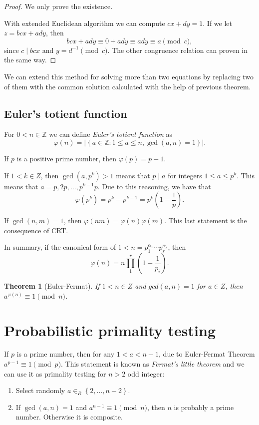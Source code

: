 \documentclass{article}
\newcommand{\Z}{\mathbb{Z}}
\newtheorem{theorem}{Theorem}
\begin{document}
\begin{proof}
    We only prove the existence.

    With extended Euclidean algorithm we can compute $cx + dy = 1$.
    If we let $z = bcx + ady$, then
    \[
        bcx + ady \equiv 0 + ady \equiv ady \equiv a \pmod{c},
    \]
    since $c \mid bcx$ and $y=d^{-1} \pmod{c}$.
    The other congruence relation can proven in the same way.
\end{proof}

We can extend this method for solving more than two equations by replacing two of them with the common solution calculated with the help of previous theorem.

\subsection{Euler's totient function}

For $0 < n \in \Z$ we can define \emph{Euler's totient function} as
\[
    \varphi(n)  = \left \lvert \left \{ a \in \Z : 1 \le a \le n, \gcd(a,n) = 1 \right \} \right \rvert.
\]

If $p$ is a positive prime number, then $\varphi(p) = p - 1$.

If $1 < k \in Z$, then $\gcd(a, p^k) > 1$ means that $p \mid a$ for integers $1 \le a \le p^k$.
This means that $a = p, 2p, \dots, p^{k-1}p$. Due to this reasoning, we have that
\[
    \varphi\left( p^k \right) = p^k - p^{k-1} = p^k \left( 1 - \frac{1}{p} \right).
\]

If $\gcd(n,m)=1$, then $\varphi(nm) = \varphi(n)\varphi(m)$. This last statement is the consequence of CRT.

In summary, if the canonical form of $1 < n = p_1^{\alpha_1}\cdots p_r^{\alpha_r}$, then
\[
    \varphi(n) = n \prod_{1}^{r} \left( 1 - \frac{1}{p_i} \right).
\]

\begin{theorem}[Euler-Fermat]
    If $1 < n \in Z$ and $gcd(a,n) = 1$ for $a \in Z$, then $a^{\varphi(n)} \equiv 1 \pmod{n}$.
\end{theorem}

\section{Probabilistic primality testing}

If $p$ is a prime number, then for any $1 < a < n-1$, due to Euler-Fermat Theorem $a^{p-1} \equiv 1 \pmod{p}$.
This statement is known as \emph{Fermat's little theorem} and we can use it as primality testing for $n > 2$ odd integer:
\begin{enumerate}
    \item Select randomly $a \in_R \left \{ 2, \ldots, n-2 \right \}$.
    \item If $\gcd(a,n)=1$ and $a^{n-1} \equiv 1 \pmod{n}$, then $n$ is probably a prime number. Otherwise it is composite.
\end{enumerate}
\end{document}
